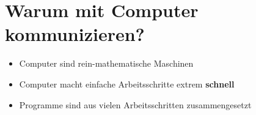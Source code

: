 
\section{Warum mit Computer kommunizieren?}
\begin{frame}
	\slidehead
	\vspace{3mm}
	\begin{itemize}
		\item Computer sind rein-mathematische Maschinen
		\item Computer macht einfache Arbeitsschritte extrem \textbf{schnell}
		\item Programme sind aus vielen Arbeitsschritten zusammengesetzt
	\end{itemize}
\end{frame}

